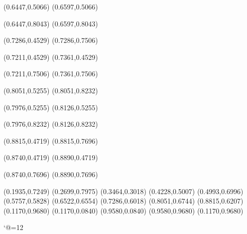 \PST@Solid(0.6447,0.5066)
(0.6597,0.5066)

\PST@Solid(0.6447,0.8043)
(0.6597,0.8043)

\PST@Solid(0.7286,0.4529)
(0.7286,0.7506)

\PST@Solid(0.7211,0.4529)
(0.7361,0.4529)

\PST@Solid(0.7211,0.7506)
(0.7361,0.7506)

\PST@Solid(0.8051,0.5255)
(0.8051,0.8232)

\PST@Solid(0.7976,0.5255)
(0.8126,0.5255)

\PST@Solid(0.7976,0.8232)
(0.8126,0.8232)

\PST@Solid(0.8815,0.4719)
(0.8815,0.7696)

\PST@Solid(0.8740,0.4719)
(0.8890,0.4719)

\PST@Solid(0.8740,0.7696)
(0.8890,0.7696)

\PST@Diamond(0.1935,0.7249)
\PST@Diamond(0.2699,0.7975)
\PST@Diamond(0.3464,0.3018)
\PST@Diamond(0.4228,0.5007)
\PST@Diamond(0.4993,0.6996)
\PST@Diamond(0.5757,0.5828)
\PST@Diamond(0.6522,0.6554)
\PST@Diamond(0.7286,0.6018)
\PST@Diamond(0.8051,0.6744)
\PST@Diamond(0.8815,0.6207)
\PST@Border(0.1170,0.9680)
(0.1170,0.0840)
(0.9580,0.0840)
(0.9580,0.9680)
(0.1170,0.9680)

\catcode`@=12
\fi
\endpspicture
